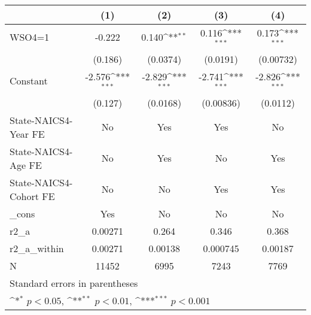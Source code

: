 {
\def\sym#1{\ifmmode^{#1}\else\(^{#1}\)\fi}
\begin{tabular}{l*{4}{c}}
\hline\hline
                    &\multicolumn{1}{c}{(1)}         &\multicolumn{1}{c}{(2)}         &\multicolumn{1}{c}{(3)}         &\multicolumn{1}{c}{(4)}         \\
\hline
WSO4=1              &      -0.222         &       0.140\sym{**} &       0.116\sym{***}&       0.173\sym{***}\\
                    &     (0.186)         &    (0.0374)         &    (0.0191)         &   (0.00732)         \\
[1em]
Constant            &      -2.576\sym{***}&      -2.829\sym{***}&      -2.741\sym{***}&      -2.826\sym{***}\\
                    &     (0.127)         &    (0.0168)         &   (0.00836)         &    (0.0112)         \\
[1em]
State-NAICS4-Year FE&          No         &         Yes         &         Yes         &          No         \\
[1em]
State-NAICS4-Age FE &          No         &         Yes         &          No         &         Yes         \\
[1em]
State-NAICS4-Cohort FE&          No         &          No         &         Yes         &         Yes         \\
[1em]
\_cons              &         Yes         &          No         &          No         &          No         \\
\hline
r2\_a                &     0.00271         &       0.264         &       0.346         &       0.368         \\
r2\_a\_within         &     0.00271         &     0.00138         &    0.000745         &     0.00187         \\
N                   &       11452         &        6995         &        7243         &        7769         \\
\hline\hline
\multicolumn{5}{l}{\footnotesize Standard errors in parentheses}\\
\multicolumn{5}{l}{\footnotesize \sym{*} \(p<0.05\), \sym{**} \(p<0.01\), \sym{***} \(p<0.001\)}\\
\end{tabular}
}
